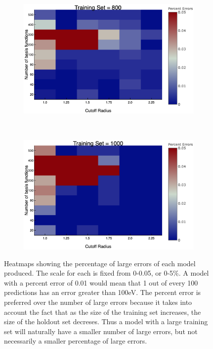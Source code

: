 \begin{figure}
\begin{subfigure}{0.5\textwidth}
    \caption{} 
    \label{perErrors6}
  \end{subfigure}%
    \hspace*{\fill}   %
  \begin{subfigure}{0.5\textwidth}
    \includegraphics[width=\linewidth]{Figures/perErrors8}
    \caption{} 
    \label{perErrors8}
  \end{subfigure}%
    \\
  \begin{subfigure}{0.5\textwidth}
    \includegraphics[width=\linewidth]{Figures/perErrors10}
    \caption{} 
    \label{perErrors10}
  \end{subfigure}%
\caption{Heatmaps showing the percentage of large errors of each model produced. The scale for each is fixed from 0-0.05, or 0-5\%. A model with a percent error of 0.01 would mean that 1 out of every 100 predictions has an error greater than 100eV. The percent error is preferred over the number of large errors because it takes into account the fact that as the size of the training set increases, the size of the holdout set decreses. Thus a model with a large training set will naturally have a smaller number of large errors, but not necessarily a smaller percentage of large errors.
\label{perErrorHeatmaps}}
\end{figure}


